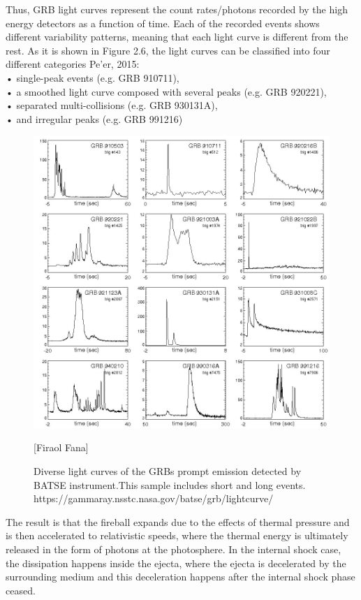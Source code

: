 Thus, GRB light curves represent the count rates/photons recorded by the
high energy detectors as a function of time. Each of the recorded events shows
different variability patterns, meaning that each light curve is different from the
rest. As it is shown in Figure 2.6, the light curves can be classified into four
different categories Pe’er, 2015:\\
• single-peak events (e.g. GRB 910711),\\
• a smoothed light curve composed with several peaks (e.g. GRB 920221),\\
• separated multi-collisions (e.g. GRB 930131A),\\
• and irregular peaks (e.g. GRB 991216)\\
\begin{figure}[h]
\begin{center}
\includegraphics[scale=0.4]{Figures/prompt.png}
\caption{Diverse light curves of the GRBs prompt emission detected by BATSE instrument.This sample includes short and long events. https://gammaray.nsstc.nasa.gov/batse/grb/lightcurve/}[Firaol Fana]
\end{center}
\end{figure}
The result is that the fireball expands due to the effects of thermal pressure and
is then accelerated to relativistic speeds, where the thermal energy is ultimately
released in the form of photons at the photosphere. In the internal shock case,
the dissipation happens inside the ejecta, where the ejecta is decelerated by the
surrounding medium and this deceleration happens after the internal shock phase
ceased. \citep{6}\citep{10}\citep{23}

